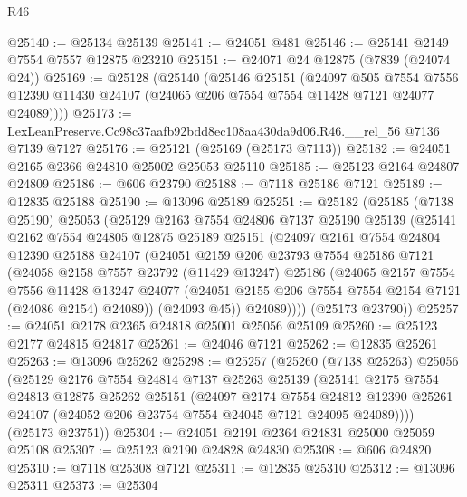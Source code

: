 \begin{lexlean}{R46}
\begin{coremodule}
@25140 := @25134 @25139
@25141 := @24051 @481
@25146 := @25141 @2149 @7554 @7557 @12875 @23210
@25151 := @24071 @24 @12875 (@7839 (@24074 @24))
@25169 := @25128
    (@25140
      (@25146
        @25151
        (@24097
          @505
          @7554
          @7556
          @12390
          @11430
          @24107
          (@24065 @206 @7554 @7554 @11428 @7121 @24077 @24089))))
@25173 := LexLeanPreserve.Cc98c37aafb92bdd8ec108aa430da9d06.R46.__rel_56 @7136 @7139 @7127
@25176 := @25121 (@25169 (@25173 @7113))
@25182 := @24051 @2165 @2366 @24810 @25002 @25053 @25110
@25185 := @25123 @2164 @24807 @24809
@25186 := @606 @23790
@25188 := @7118 @25186 @7121
@25189 := @12835 @25188
@25190 := @13096 @25189
@25251 := @25182
    (@25185
      (@7138 @25190)
      @25053
      (@25129
        @2163
        @7554
        @24806
        @7137
        @25190
        @25139
        (@25141
          @2162
          @7554
          @24805
          @12875
          @25189
          @25151
          (@24097
            @2161
            @7554
            @24804
            @12390
            @25188
            @24107
            (@24051
              @2159
              @206
              @23793
              @7554
              @25186
              @7121
              (@24058
                @2158
                @7557
                @23792
                (@11429 @13247)
                @25186
                (@24065
                  @2157
                  @7554
                  @7556
                  @11428
                  @13247
                  @24077
                  (@24051 @2155 @206 @7554 @7554 @2154 @7121 (@24086 @2154) @24089))
                (@24093 @45))
              @24089))))
      (@25173 @23790))
@25257 := @24051 @2178 @2365 @24818 @25001 @25056 @25109
@25260 := @25123 @2177 @24815 @24817
@25261 := @24046 @7121
@25262 := @12835 @25261
@25263 := @13096 @25262
@25298 := @25257
    (@25260
      (@7138 @25263)
      @25056
      (@25129
        @2176
        @7554
        @24814
        @7137
        @25263
        @25139
        (@25141
          @2175
          @7554
          @24813
          @12875
          @25262
          @25151
          (@24097
            @2174
            @7554
            @24812
            @12390
            @25261
            @24107
            (@24052 @206 @23754 @7554 @24045 @7121 @24095 @24089))))
      (@25173 @23751))
@25304 := @24051 @2191 @2364 @24831 @25000 @25059 @25108
@25307 := @25123 @2190 @24828 @24830
@25308 := @606 @24820
@25310 := @7118 @25308 @7121
@25311 := @12835 @25310
@25312 := @13096 @25311
@25373 := @25304

\end{coremodule}
\end{lexlean}
